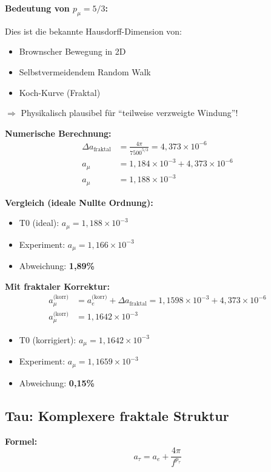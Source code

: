 	\textbf{Bedeutung von $p_\mu = 5/3$:}
	
	Dies ist die bekannte Hausdorff-Dimension von:
	\begin{itemize}
		\item Brownscher Bewegung in 2D
		\item Selbstvermeidendem Random Walk
		\item Koch-Kurve (Fraktal)
	\end{itemize}
	
	$\Rightarrow$ Physikalisch plausibel für ``teilweise verzweigte Windung''!
	
	\textbf{Numerische Berechnung:}
	\begin{align}
		\Delta a_{\text{fraktal}} &= \frac{4\pi}{7500^{5/3}} = 4{,}373 \times 10^{-6} \\
		a_\mu &= 1{,}184 \times 10^{-3} + 4{,}373 \times 10^{-6} \\
		a_\mu &= 1{,}188 \times 10^{-3}
	\end{align}
	
	\textbf{Vergleich (ideale Nullte Ordnung):}
	\begin{itemize}
		\item T0 (ideal): $a_\mu = 1{,}188 \times 10^{-3}$
		\item Experiment: $a_\mu = 1{,}166 \times 10^{-3}$
		\item Abweichung: \textbf{1{,}89\%}
	\end{itemize}
	
	\textbf{Mit fraktaler Korrektur:}
	\begin{align}
		a_\mu^\text{(korr)} &= a_e^\text{(korr)} + \Delta a_\text{fraktal} = 1{,}1598 \times 10^{-3} + 4{,}373 \times 10^{-6} \\
		a_\mu^\text{(korr)} &= 1{,}1642 \times 10^{-3}
	\end{align}
	\begin{itemize}
		\item T0 (korrigiert): $a_\mu = 1{,}1642 \times 10^{-3}$
		\item Experiment: $a_\mu = 1{,}1659 \times 10^{-3}$
		\item Abweichung: \textbf{0{,}15\%}
	\end{itemize}
	
	\subsection{Tau: Komplexere fraktale Struktur}
	
	\textbf{Formel:}
	\begin{equation}
		a_\tau = a_e + \frac{4\pi}{f^{p_\tau}}
		\label{eq:atau}
	\end{equation}
	
